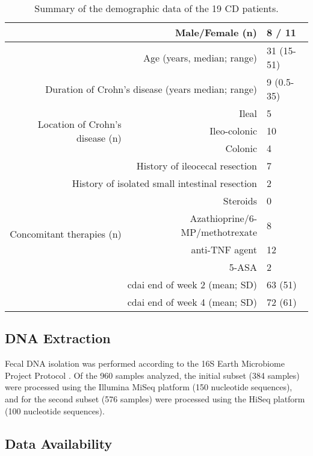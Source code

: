 \begin{table}[htbp]
    \centering
    \caption{Summary of the demographic data of the 19 CD patients.}
    \label{id-tabMethods}
    \begin{tabular*}{\textwidth}{rrl}
    \toprule
         \multicolumn{2}{r}{Male/Female (n)} &	8 / 11\\
    \midrule
    \multicolumn{2}{r}{Age (years, median; range)} &	31 (15-51)\\
\midrule
\multicolumn{2}{r}{Duration of Crohn's disease (years median; range)} &	9 (0.5-35)\\
\midrule
\multirow{3}{*}{Location of Crohn's disease (n)} & 	Ileal & 5\\
 &   	Ileo-colonic & 10\\
 &     	Colonic	 & 4\\
\midrule
\multicolumn{2}{r}{History of ileocecal resection} &	7\\
\midrule
\multicolumn{2}{r}{History of isolated small intestinal resection} &	2\\
\midrule
\multirow{4}{*}{Concomitant therapies (n)} &        	Steroids & 0\\
&        	Azathioprine/6-MP/methotrexate & 8\\
 &        	anti-TNF agent & 12\\
     &   	5-ASA	 &2\\
\midrule
\multicolumn{2}{r}{\gls{cdai} end of week 2 (mean; SD)} &	63 (51)\\
\midrule
\multicolumn{2}{r}{\gls{cdai} end of week 4 (mean; SD)} &	72 (61)\\
\bottomrule
    \end{tabular*}
\end{table}

\subsection{DNA Extraction}

Fecal DNA isolation was performed according to the 16S Earth Microbiome Project 
Protocol \cite{RN164}. Of the 960 samples analyzed, the initial subset (384 
samples)  were processed using the Illumina MiSeq platform (150 nucleotide 
sequences), and for the second subset (576 samples) were processed using the 
HiSeq platform (100 nucleotide sequences).

\subsection{Data Availability}

